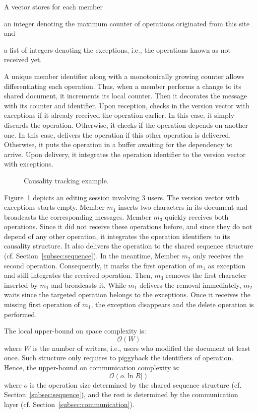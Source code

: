 A vector stores for each member
\begin{inparaenum}[(i)]
\item an integer denoting the maximum counter of operations originated from
  this site and
\item a list of integers denoting the exceptions, i.e., the operations known
  as not received yet.
\end{inparaenum}

A unique member identifier along with a monotonically growing counter allows
differentiating each operation. Thus, when a member performs a change to its
shared document, it increments its local counter. Then it decorates the message
with its counter and identifier. Upon reception, \CRATE checks in the version
vector with exceptions if it already received the operation earlier. In this
case, it simply discards the operation.  Otherwise, it checks if the operation
depends on another one. In this case, \CRATE delivers the operation if this
other operation is delivered. Otherwise, it puts the operation in a buffer
awaiting for the dependency to arrive. Upon delivery, it integrates the
operation identifier to the version vector with exceptions.

\begin{figure}
  \centering
  
  \caption{\label{fig:timeline} Causality tracking example.}
\end{figure}

Figure~\ref{fig:timeline} depicts an editing session involving 3 users. The
version vector with exceptions starts empty. Member $m_1$ inserts two characters
in its document and broadcasts the corresponding messages. Member $m_3$ quickly
receives both operations. Since it did not receive these operations before, and
since they do not depend of any other operation, it integrates the operation
identifiers to its causality structure. It also delivers the operation to the
shared sequence structure (cf. Section~\ref{subsec:sequence}). In the meantime,
Member $m_2$ only receives the second operation. Consequently, it marks the
first operation of $m_1$ as exception and still integrates the received
operation. Then, $m_3$ removes the first character inserted by $m_1$ and
broadcasts it. While $m_1$ delivers the removal immediately, $m_2$ waits since
the targeted operation belongs to the exceptions. Once it receives the missing
first operation of $m_1$, the exception disappears and the delete operation is
performed.

The local upper-bound on space complexity is:
\begin{equation}
  \mathcal{O}(W)
\end{equation}
where $W$ is the number of writers, i.e., users who modified the
document at least once.  Such structure only requires to piggyback the
identifiers of operation. Hence, the upper-bound on communication complexity
is:
\begin{equation}
  \mathcal{O}(o.\ln R|)
\end{equation}
where $o$ is the operation size determined by the shared sequence structure
(cf. Section~\ref{subsec:sequence}), and the rest is determined by the
communication layer (cf. Section~\ref{subsec:communication}).

